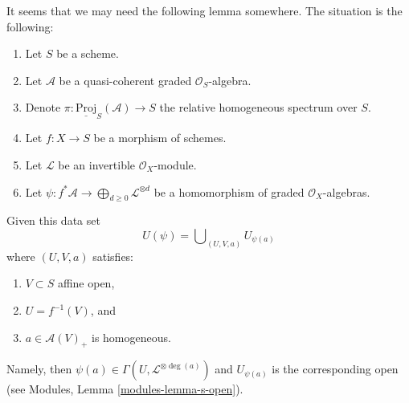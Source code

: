 \noindent
It seems that we may need the following lemma somewhere.
The situation is the following:
\begin{enumerate}
\item Let $S$ be a scheme.
\item Let $\mathcal{A}$ be a quasi-coherent graded $\mathcal{O}_S$-algebra.
\item Denote $\pi : \underline{\text{Proj}}_S(\mathcal{A}) \to S$ the relative
homogeneous spectrum over $S$.
\item Let $f : X \to S$ be a morphism of schemes.
\item Let $\mathcal{L}$ be an invertible $\mathcal{O}_X$-module.
\item Let $\psi : f^*\mathcal{A} \to
\bigoplus_{d \geq 0} \mathcal{L}^{\otimes d}$
be a homomorphism of graded $\mathcal{O}_X$-algebras.
\end{enumerate}
Given this data set
$$
U(\psi) = \bigcup\nolimits_{(U, V, a)} U_{\psi(a)}
$$
where $(U, V, a)$ satisfies:
\begin{enumerate}
\item $V \subset S$ affine open,
\item $U = f^{-1}(V)$, and
\item $a \in \mathcal{A}(V)_{+}$ is homogeneous.
\end{enumerate}
Namely, then $\psi(a) \in \Gamma(U, \mathcal{L}^{\otimes \deg(a)})$
and $U_{\psi(a)}$ is the corresponding open (see
Modules, Lemma \ref{modules-lemma-s-open}).

